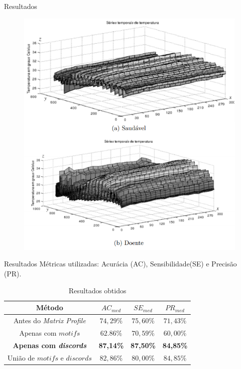 \documentclass[apesctratio=169]{beamer}
\begin{document}
	\begin{frame}{Resultados}
        \begin{figure}[htb]
			     \includegraphics[scale=0.4]{series.PNG}
		\end{figure}
	\end{frame}
	
	
	\begin{frame}{Resultados}
	    Métricas utilizadas: Acurácia (AC), Sensibilidade(SE) e Precisão (PR).
	    \begin{table}[htb]
        	\centering
        	\begin{tabular}{c|c|c|c}
        		\hline		
        	    Método & $AC_{med}$ & $SE_{med}$ & $PR_{med}$\\
        		\hline
        		Antes do \textit{Matrix Profile} & $74,29\%$ & $75,60\%$ & $71,43\%$\\
        		\hline
        		Apenas com $motifs$ & $62.86\%$ & $70,59\%$ & $60,00\%$\\
        		\hline
        		\textbf{Apenas com \textit{discords}} & \textbf{87,14\%} & \textbf{87,50\%} & \textbf{84,85\%}\\
        		\hline
        		União de $motifs$ e $discords$ & $82,86\%$ & $80,00\%$ & $84,85\%$\\
        		\hline
        	\end{tabular}
        	\caption{Resultados obtidos}
        	\label{tabela-1}
        \end{table}
	\end{frame}
	
\end{document}

